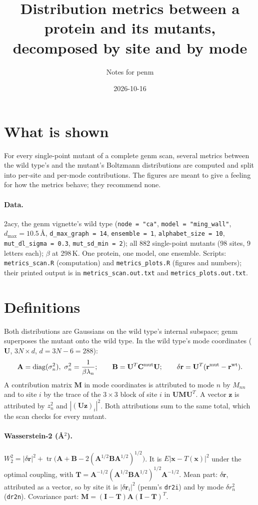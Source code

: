 \documentclass[11pt]{article}
\title{Distribution metrics between a protein and its mutants, decomposed by site and by mode}
\author{Notes for penm}
\date{2026-10-16}
\newcommand{\code}[1]{\texttt{#1}}
\newcommand{\tr}{\operatorname{tr}}
\begin{document}
\maketitle

\section{What is shown}

For every single-point mutant of a complete genm scan, several metrics between the wild type's and
the mutant's Boltzmann distributions are computed and split into per-site and per-mode contributions.
The figures are meant to give a feeling for how the metrics behave; they recommend none.

\paragraph{Data.} 2acy, the genm vignette's wild type (\code{node = "ca"}, \code{model = "ming\_wall"},
$d_{\max}=10.5$\,\AA, \code{d\_max\_graph = 14}, \code{ensemble = 1}, \code{alphabet\_size = 10},
\code{mut\_dl\_sigma = 0.3}, \code{mut\_sd\_min = 2}); all 882 single-point mutants (98 sites, 9 letters
each); $\beta$ at 298\,K. One protein, one model, one ensemble. Scripts: \code{metrics\_scan.R}
(computation) and \code{metrics\_plots.R} (figures and numbers); their printed output is in
\code{metrics\_scan.out.txt} and \code{metrics\_plots.out.txt}.

\section{Definitions}

Both distributions are Gaussians on the wild type's internal subspace; genm superposes the mutant
onto the wild type. In the wild type's mode coordinates ($\mathbf{U}$, $3N\times d$, $d=3N-6=288$):
\[
\mathbf{A}=\operatorname{diag}(\sigma_n^2),\ \sigma_n^2=\frac{1}{\beta\lambda_n};\qquad
\mathbf{B}=\mathbf{U}^T\mathbf{C}^{\rm mut}\mathbf{U};\qquad
\delta\mathbf{r}=\mathbf{U}^T(\mathbf{r}^{\rm mut}-\mathbf{r}^{\rm wt}).
\]
A contribution matrix $\mathbf{M}$ in mode coordinates is attributed to mode $n$ by $M_{nn}$ and to
site $i$ by the trace of the $3\times3$ block of site $i$ in $\mathbf{U}\mathbf{M}\mathbf{U}^T$.
A vector $\mathbf{z}$ is attributed by $z_n^2$ and $|(\mathbf{U}\mathbf{z})_i|^2$.
Both attributions sum to the same total, which the scan checks for every mutant.

\paragraph{Wasserstein-2 (\AA$^2$).}
$W_2^2 = |\delta\mathbf{r}|^2 + \tr\bigl(\mathbf{A}+\mathbf{B}-2(\mathbf{A}^{1/2}\mathbf{B}\mathbf{A}^{1/2})^{1/2}\bigr)$.
It is $E|\mathbf{x}-T(\mathbf{x})|^2$ under the optimal coupling, with
$\mathbf{T}=\mathbf{A}^{-1/2}(\mathbf{A}^{1/2}\mathbf{B}\mathbf{A}^{1/2})^{1/2}\mathbf{A}^{-1/2}$.
Mean part: $\delta\mathbf{r}$, attributed as a vector, so by site it is $|\delta\mathbf{r}_i|^2$
(penm's \code{dr2i}) and by mode $\delta r_n^2$ (\code{dr2n}).
Covariance part: $\mathbf{M}=(\mathbf{I}-\mathbf{T})\mathbf{A}(\mathbf{I}-\mathbf{T})^T$.
\end{document}
